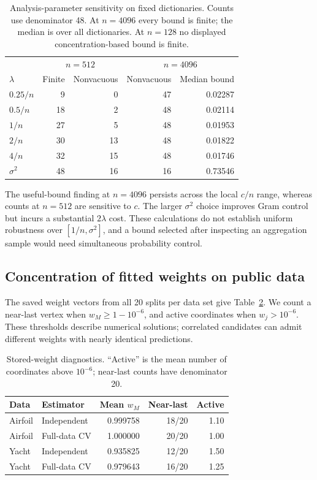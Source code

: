 \documentclass[pdflatex,sn-mathphys-ay]{sn-jnl}
\theoremstyle{remark}\newtheorem{remark}[theorem]{Remark}
\begin{document}
\begin{table}[htbp]\centering\small
\caption{Analysis-parameter sensitivity on fixed dictionaries. Counts use denominator 48. At $n=4096$ every bound is finite; the median is over all dictionaries. At $n=128$ no displayed concentration-based bound is finite.}\label{tab:lambdasensitivity}
\begin{tabular}{lrrrr}\toprule
&\multicolumn{2}{c}{$n=512$}&\multicolumn{2}{c}{$n=4096$}\\
$\lambda$&Finite&Nonvacuous&Nonvacuous&Median bound\\\midrule
$0.25/n$&9&0&47&0.02287\\
$0.5/n$&18&2&48&0.02114\\
$1/n$&27&5&48&0.01953\\
$2/n$&30&13&48&0.01822\\
$4/n$&32&15&48&0.01746\\
$\sigma^2$&48&16&16&0.73546\\\bottomrule
\end{tabular}\end{table}

The useful-bound finding at $n=4096$ persists across the local $c/n$ range, whereas counts at $n=512$ are sensitive to $c$. The larger $\sigma^2$ choice improves Gram control but incurs a substantial $2\lambda$ cost. These calculations do not establish uniform robustness over $[1/n,\sigma^2]$, and a bound selected after inspecting an aggregation sample would need simultaneous probability control.

\subsection{Concentration of fitted weights on public data}
The saved weight vectors from all 20 splits per data set give Table~\ref{tab:weightconcentration}. We count a near-last vertex when $w_M\geq1-10^{-6}$, and active coordinates when $w_j>10^{-6}$. These thresholds describe numerical solutions; correlated candidates can admit different weights with nearly identical predictions.

\begin{table}[htbp]\centering\small
\caption{Stored-weight diagnostics. ``Active'' is the mean number of coordinates above $10^{-6}$; near-last counts have denominator 20.}\label{tab:weightconcentration}
\begin{tabular}{llrrr}\toprule
Data & Estimator & Mean $w_M$ & Near-last & Active\\\midrule
Airfoil & Independent & 0.999758 & 18/20 & 1.10\\
Airfoil & Full-data CV & 1.000000 & 20/20 & 1.00\\
Yacht & Independent & 0.935825 & 12/20 & 1.50\\
Yacht & Full-data CV & 0.979643 & 16/20 & 1.25\\\bottomrule
\end{tabular}\end{table}
\end{document}
